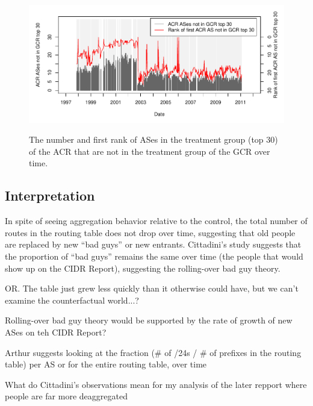\begin{figure}[H]
\begin{centering}
    \includegraphics[width=6in]{figures/cidr_report_validity_top30_error.pdf}
    \vspace{-2em}\\
    \caption{The number and first rank of ASes in the treatment group (top 30) of the ACR that are not in the treatment group of the GCR over time.}
\end{centering}
\end{figure}


\subsection{Interpretation}

In spite of seeing aggregation behavior relative to the control, the total number of routes in the routing table does not drop over time, suggesting that old people are replaced by new ``bad guys'' or new entrants. Cittadini's study suggests that the proportion of ``bad guys'' remains the same over time (the people that would show up on the CIDR Report), suggesting the rolling-over bad guy theory.

OR. The table just grew less quickly than it otherwise could have, but we can't examine the counterfactual world...?

Rolling-over bad guy theory would be supported by the rate of growth of new ASes on teh CIDR Report?

Arthur suggests looking at the fraction (\# of /24s / \# of prefixes in the routing table) per AS or for the entire routing table, over time

What do Cittadini's observations mean for my analysis of the later repport where people are far more deaggregated

